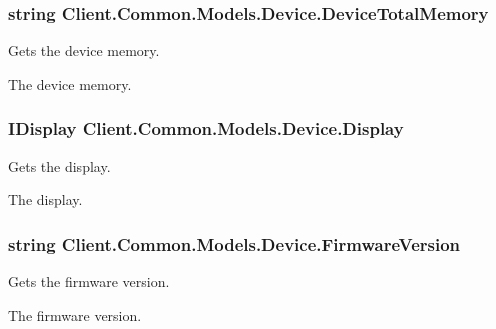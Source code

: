 \subsubsection[{Device\+Total\+Memory}]{\setlength{\rightskip}{0pt plus 5cm}string Client.\+Common.\+Models.\+Device.\+Device\+Total\+Memory\hspace{0.3cm}{\ttfamily [get]}}\label{classClient_1_1Common_1_1Models_1_1Device_a45a4827c220415e029d0b8e1c87bb1a0}


Gets the device memory. 

The device memory.\hypertarget{classClient_1_1Common_1_1Models_1_1Device_a5f60c2325f0cb3d3b79e42a403520c1e}{}
\subsubsection[{Display}]{\setlength{\rightskip}{0pt plus 5cm}I\+Display Client.\+Common.\+Models.\+Device.\+Display\hspace{0.3cm}{\ttfamily [get]}}\label{classClient_1_1Common_1_1Models_1_1Device_a5f60c2325f0cb3d3b79e42a403520c1e}


Gets the display. 

The display.\hypertarget{classClient_1_1Common_1_1Models_1_1Device_a6b657ab02d25e6cec66bd1a9f5028b23}{}
\subsubsection[{Firmware\+Version}]{\setlength{\rightskip}{0pt plus 5cm}string Client.\+Common.\+Models.\+Device.\+Firmware\+Version\hspace{0.3cm}{\ttfamily [get]}}\label{classClient_1_1Common_1_1Models_1_1Device_a6b657ab02d25e6cec66bd1a9f5028b23}


Gets the firmware version. 

The firmware version.\hypertarget{classClient_1_1Common_1_1Models_1_1Device_a27b2c554bccbca57b1c4b0c474d41492}{}
